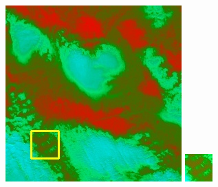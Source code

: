 \documentclass[10pt,UTF8,fntef]{ctexart}
\begin{document}
\begin{figure}[H]
{{\begin{minipage}[b]{0.15\linewidth}
            \includegraphics[width=1\linewidth]{../log/spoon3/cut/LC80290372013257LGN00_17086_spectral.jpg}\vspace{4pt}
            \includegraphics[width=1\linewidth]{../log/spoon3/cut/tmp_cut_LC80290372013257LGN00_17086_spectral.jpg}\vspace{4pt}

\end{minipage}}}
\end{figure}
\end{document}
